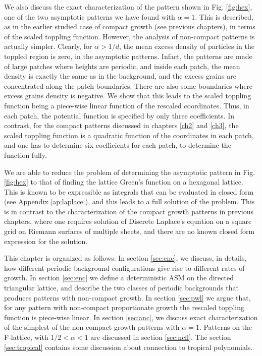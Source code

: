 \documentclass[11pt,a4paper]{book}
\begin{document}
We also discuss the exact characterization of the pattern shown in
Fig. \ref{fig:hex}, one of the two asymptotic patterns we have found
with $\alpha=1$. This is described, as in the earlier studied case of
compact growth (see previous chapters), in terms of the scaled
toppling function. However, the analysis of non-compact patterns is
actually simpler. Clearly, for $\alpha>1/d$, the mean excess density
of particles in the toppled region is zero, in the asymptotic
patterns. Infact, the patterns are made of large patches
where heights are periodic, and inside each patch, the mean
density is exactly the same as in the background, and the excess
grains are concentrated along the patch boundaries. There are also
some boundaries where excess grains density is negative. We show that
this leads to the scaled toppling function being a piece-wise linear
function of the rescaled coordinates. Thus, in each patch, the
potential function is specified by only three coefficients. In
contrast, for the compact patterns discussed in chapters \ref{ch2} and
\ref{ch3}, the scaled toppling function is a quadratic function of the
coordinates in each patch, and one has to determine six coefficients
for each patch, to determine the function fully.

We are able to reduce the problem of determining the asymptotic
pattern in Fig. \ref{fig:hex} to that of finding the lattice Green's
function on a hexagonal lattice. This is known to be expressible as
integrals that can be evaluated in closed form (see Appendix \ref{ap:laplace}), and
this leads to a full solution of the problem. This is in contrast to
the characterization of the compact growth patterns in previous
chapters, where one requires solution of Discrete Laplace's equation
on a square grid on Riemann surfaces of multiple sheets, and there are
no known closed form expression for the solution. 

This chapter is organized as follows: In section \ref{sec:cnc}, we discuss, in
details, how different periodic background configurations give rise to
different rates of growth.
In section \ref{sec:enc} we define a deterministic ASM on the directed triangular lattice, and describe the two
classes of periodic backgrounds that produces patterns with non-compact growth.
In section \ref{sec:pwl} we argue that, for any pattern with
non-compact proportionate growth the rescaled toppling function is
piece-wise linear. In section \ref{sec:anc}, we discuss exact
characterization of the simplest of the non-compact growth patterns
with $\alpha=1$. Patterns on the F-lattice, with $1/2<\alpha < 1$ are
discussed in section \ref{sec:ncfl}. The section \ref{sec:tropical}
contains some discussion about connection to tropical polynomials.
\end{document}
